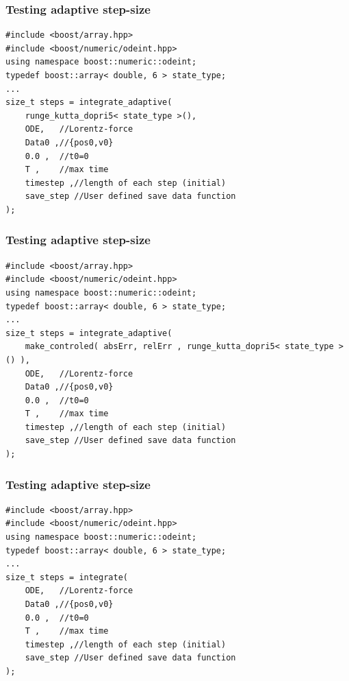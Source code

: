 \documentclass{beamer}
\begin{document}
\begin{frame}[fragile]
\frametitle{Testing adaptive step-size}
\begin{lstlisting}
#include <boost/array.hpp>
#include <boost/numeric/odeint.hpp>
using namespace boost::numeric::odeint;
typedef boost::array< double, 6 > state_type;
...
size_t steps = integrate_adaptive(
    runge_kutta_dopri5< state_type >(),
    ODE,   //Lorentz-force
    Data0 ,//{pos0,v0}
    0.0 ,  //t0=0
    T ,    //max time
    timestep ,//length of each step (initial)
    save_step //User defined save data function
);
\end{lstlisting}
\end{frame}

\begin{frame}[fragile]
\frametitle{Testing adaptive step-size}
\begin{lstlisting}
#include <boost/array.hpp>
#include <boost/numeric/odeint.hpp>
using namespace boost::numeric::odeint;
typedef boost::array< double, 6 > state_type;
...
size_t steps = integrate_adaptive(
    make_controled( absErr, relErr , runge_kutta_dopri5< state_type >() ),
    ODE,   //Lorentz-force
    Data0 ,//{pos0,v0}
    0.0 ,  //t0=0
    T ,    //max time
    timestep ,//length of each step (initial)
    save_step //User defined save data function
);
\end{lstlisting}
\end{frame}

\begin{frame}[fragile]
\frametitle{Testing adaptive step-size}
\begin{lstlisting}
#include <boost/array.hpp>
#include <boost/numeric/odeint.hpp>
using namespace boost::numeric::odeint;
typedef boost::array< double, 6 > state_type;
...
size_t steps = integrate(
    ODE,   //Lorentz-force
    Data0 ,//{pos0,v0}
    0.0 ,  //t0=0
    T ,    //max time
    timestep ,//length of each step (initial)
    save_step //User defined save data function
);
\end{lstlisting}
\end{frame}
\end{document}
